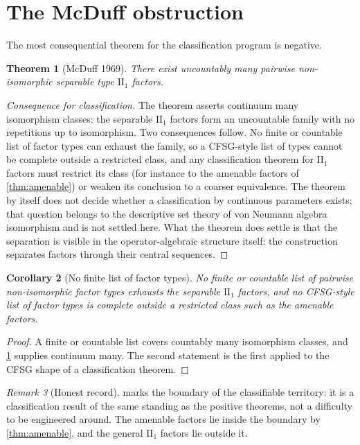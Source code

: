 \documentclass[11pt,letterpaper]{article}
\newtheorem{theorem}{Theorem}[section]
\newtheorem{corollary}[theorem]{Corollary}
\theoremstyle{definition}
\theoremstyle{remark}
\newtheorem{remark}[theorem]{Remark}
\begin{document}
\section{The McDuff obstruction}
\label{sec:mcduff}

The most consequential theorem for the classification program is negative.

\begin{theorem}[McDuff 1969]
\label{thm:mcduff}
There exist uncountably many pairwise non-isomorphic separable type $\mathrm{II}_1$ factors.
\end{theorem}

\begin{proof}[Consequence for classification]
The theorem asserts continuum many isomorphism classes: the separable $\mathrm{II}_1$ factors form an uncountable family with no repetitions up to isomorphism. Two consequences follow. No finite or countable list of factor types can exhaust the family, so a CFSG-style list of types cannot be complete outside a restricted class, and any classification theorem for $\mathrm{II}_1$ factors must restrict its class (for instance to the amenable factors of \cref{thm:amenable}) or weaken its conclusion to a coarser equivalence. The theorem by itself does not decide whether a classification by continuous parameters exists; that question belongs to the descriptive set theory of von Neumann algebra isomorphism and is not settled here. What the theorem does settle is that the separation is visible in the operator-algebraic structure itself: the construction separates factors through their central sequences.
\end{proof}

\begin{corollary}[No finite list of factor types]
\label{cor:nofinite}
No finite or countable list of pairwise non-isomorphic factor types exhausts the separable $\mathrm{II}_1$ factors, and no CFSG-style list of factor types is complete outside a restricted class such as the amenable factors.
\end{corollary}

\begin{proof}
A finite or countable list covers countably many isomorphism classes, and \cref{thm:mcduff} supplies continuum many. The second statement is the first applied to the CFSG shape of a classification theorem.
\end{proof}

\begin{remark}[Honest record]
\label{rem:mcduff}
 marks the boundary of the classifiable territory: it is a classification result of the same standing as the positive theorems, not a difficulty to be engineered around. The amenable factors lie inside the boundary by \cref{thm:amenable}, and the general $\mathrm{II}_1$ factors lie outside it.
\end{remark}
\end{document}

